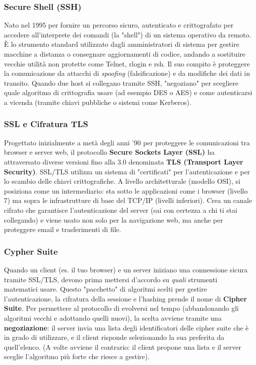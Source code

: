 \documentclass{article}
\begin{document}
\subsubsection*{Secure Shell (SSH)}

Nato nel 1995 per fornire un percorso sicuro, autenticato e crittografato per accedere all'interprete dei comandi (la "shell") di un sistema operativo da remoto. È lo strumento standard utilizzato dagli amministratori di sistema per gestire macchine a distanza o consegnare aggiornamenti di codice, andando a sostituire vecchie utilità non protette come Telnet, rlogin e rsh. Il suo compito è proteggere la comunicazione da attacchi di \textit{spoofing} (falsificazione) e da modifiche dei dati in transito. Quando due host si collegano tramite SSH, "negoziano" per scegliere quale algoritmo di crittografia usare (ad esempio DES o AES) e come autenticarsi a vicenda (tramite chiavi pubbliche o sistemi come Kerberos).

\subsubsection*{SSL e Cifratura TLS}

Progettato inizialmente a metà degli anni '90 per proteggere le comunicazioni tra browser e server web, il protocollo \textbf{Secure Sockets Layer (SSL)} ha attraversato diverse versioni fino alla 3.0 denominata \textbf{TLS (Transport Layer Security)}. SSL/TLS utilizza un sistema di "certificati" per l'autenticazione e per lo scambio delle chiavi crittografiche. A livello architetturale (modello OSI), si posiziona come un intermediario: sta sotto le applicazioni come i browser (livello 7) ma sopra le infrastrutture di base del TCP/IP (livelli inferiori). Crea un canale cifrato che garantisce l'autenticazione del server (sai con certezza a chi ti stai collegando) e viene usato non solo per la navigazione web, ma anche per proteggere email e trasferimenti di file.

\subsubsection*{Cypher Suite}

Quando un client (es. il tuo browser) e un server iniziano una connessione sicura tramite SSL/TLS, devono prima mettersi d'accordo su \textit{quali} strumenti matematici usare. Questo "pacchetto" di algoritmi scelti per gestire l'autenticazione, la cifratura della sessione e l'hashing prende il nome di \textbf{Cipher Suite}. Per permettere al protocollo di evolversi nel tempo (abbandonando gli algoritmi vecchi e adottando quelli nuovi), la scelta avviene tramite una \textbf{negoziazione}: il server invia una lista degli identificatori delle cipher suite che è in grado di utilizzare, e il client risponde selezionando la sua preferita da quell'elenco. (A volte avviene il contrario: il client propone una lista e il server sceglie l'algoritmo più forte che riesce a gestire).
\end{document}
